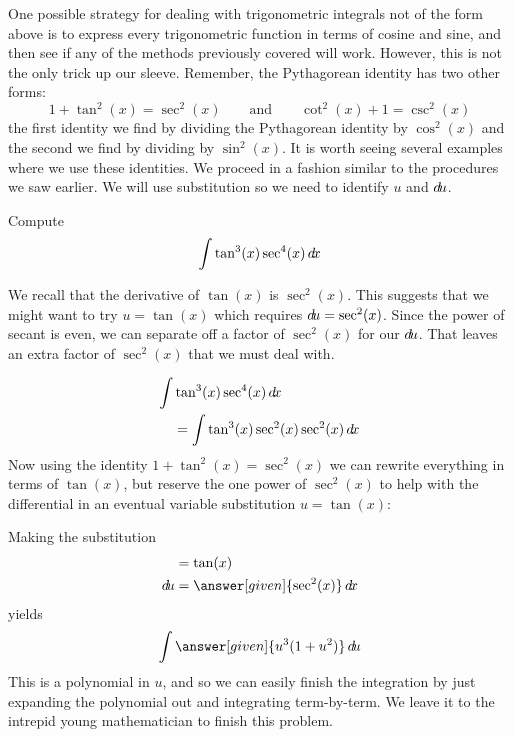 \documentclass{ximera}
\begin{document}
One possible strategy for dealing with trigonometric integrals not of the form above is to
express every trigonometric function in terms of cosine and sine, and
then see if any of the methods previously covered will work. However, this is not the only trick up
our sleeve.  Remember, the Pythagorean identity has two other forms:
\[
1 + \tan^2(x) = \sec^2(x) \qquad\text{and}\qquad \cot^2(x) + 1 = \csc^2(x)
\]
the first identity we find by dividing the Pythagorean identity by
$\cos^2(x)$ and the second we find by dividing by $\sin^2(x)$. It is
worth seeing several examples where we use these identities. We proceed in a fashion similar to the procedures we saw earlier. We will use substitution so we need to identify $u$ and $\mathop{}\!d\! u$. 



\begin{example}
  Compute
  \[
  \int \tan^3(x) \sec^4(x) \mathop{}\!d\! x
  \]
  \begin{explanation}
    We recall that the derivative of $\tan(x)$ is $\sec^{2}(x)$. This suggests that we might want to try $u=\tan(x)$ which requires 
    $\mathop{}\!d\! u=\sec^{2}(x)$. 
    Since the power of secant is even, we can separate off a factor of $\sec^{2}(x)$ for our $\mathop{}\!d\! u$. That leaves an extra factor
    of $\sec^{2}(x)$ that we must deal with. 

    \begin{align*}
    \int &\tan^3(x) \sec^4(x) \mathop{}\!d\! x \\
    &= \int\tan^3(x) \sec^2(x) \sec^2(x) \mathop{}\!d\! x
    \end{align*}
    Now using the identity $1+\tan^{2}(x)=\sec^{2}(x)$ we can rewrite everything in
    terms of $\tan(x)$, but reserve the one power of $\sec^2(x)$ to help
    with the differential in an eventual variable substitution $u=\tan(x)$:
    \begin{center}%
    \end{center}
    Making the substitution
    \begin{align*}
       &= \tan(x)\\
      \d u &=\answer[given]{\sec^2(x)} \d x
    \end{align*}
    yields
    \[
    \int \answer[given]{u^3(1+u^2)} \d u
    \]
    This is a polynomial in $u$, and so we can easily finish the
    integration by just expanding the polynomial out and integrating
    term-by-term. We leave it to the intrepid young mathematician to
    finish this problem.
  \end{explanation}
\end{example}
\end{document}

